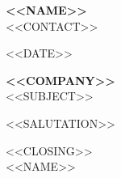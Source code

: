 \documentclass[11pt, a4paper]{article}   %
\begin{document}
\begin{center}
    {\Large\bfseries <<NAME>>}\\[3pt]
    <<CONTACT>>
\end{center}
\vspace{4pt}

<<DATE>>

\textbf{<<COMPANY>>}\\
<<SUBJECT>>

<<SALUTATION>>


<<CLOSING>>\\[14pt]
<<NAME>>
\end{document}
